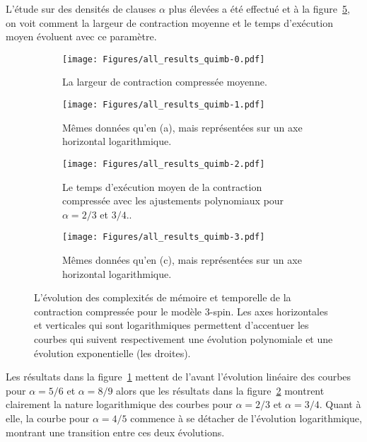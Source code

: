 L'étude sur des densités de clauses $\alpha$ plus élevées a été effectué et à la figure~\ref{fig:all-results-quimb}, on voit comment la largeur de contraction moyenne et le temps d'exécution moyen évoluent avec ce paramètre.
\begin{figure}[h!]
    \centering
    \begin{subfigure}{.49\textwidth}
        \centering
        \texttt{[image: Figures/all\_results\_quimb-0.pdf]}
        \caption{La largeur de contraction compressée moyenne.}
        \label{subfig:all-results-quimb-a}
    \end{subfigure}
    \hfill
    \begin{subfigure}{.49\textwidth}
        \centering
        \texttt{[image: Figures/all\_results\_quimb-1.pdf]}
        \caption{Mêmes données qu'en (a), mais représentées sur un axe horizontal logarithmique.}
        \label{subfig:all-results-quimb-b}
    \end{subfigure}

    \medskip

    \begin{subfigure}{.49\textwidth}
        \centering
        \texttt{[image: Figures/all\_results\_quimb-2.pdf]}
        \caption{Le temps d'exécution moyen de la contraction compressée avec les ajustements polynomiaux pour $\alpha = 2/3$ et $3/4$..}
        \label{subfig:all-results-quimb-c}
    \end{subfigure}
    \hfill
    \begin{subfigure}{.49\textwidth}
        \centering
        \texttt{[image: Figures/all\_results\_quimb-3.pdf]}
        \caption{Mêmes données qu'en (c), mais représentées sur un axe horizontal logarithmique.}
        \label{subfig:all-results-quimb-d}
    \end{subfigure}
    \caption[L'évolution des complexités de mémoire et temporelle de la contraction compressée pour le modèle $3$-spin.]{L'évolution des complexités de mémoire et temporelle de la contraction compressée pour le modèle $3$-spin.  Les axes horizontales et verticales qui sont logarithmiques permettent d'accentuer les courbes qui suivent respectivement une évolution polynomiale et une évolution exponentielle (les droites).}
    \label{fig:all-results-quimb}
\end{figure}
Les résultats dans la figure~\ref{subfig:all-results-quimb-a} mettent de l'avant l'évolution linéaire des courbes pour $\alpha = 5/6$ et $\alpha = 8/9$ alors que les résultats dans la figure~\ref{subfig:all-results-quimb-b} montrent clairement la nature logarithmique des courbes pour $\alpha = 2/3$ et $\alpha = 3/4$.
Quant à elle, la courbe pour $\alpha = 4/5$ commence à se détacher de l'évolution logarithmique, montrant une transition entre ces deux évolutions.

